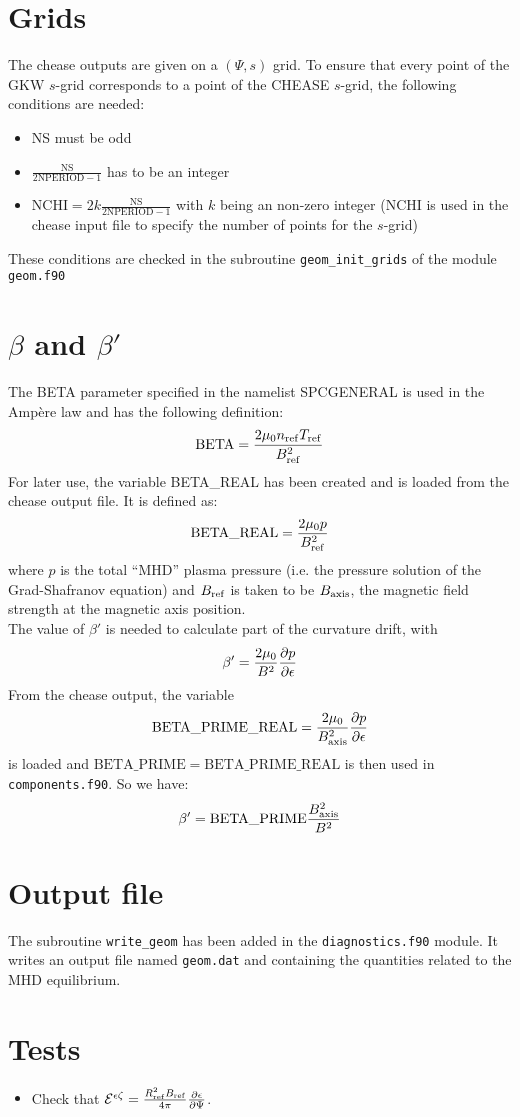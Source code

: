 \documentclass[a4paper,12pt]{article}
\newcommand{\ind}[1]{\ensuremath{_{\rm{#1}}}}
\begin{document}
\section{Grids}
The chease outputs are given on a $(\Psi,s)$ grid. To ensure that every point of the GKW $s$-grid corresponds to a point of the CHEASE $s$-grid, the following conditions are needed:
\begin{itemize}
 \item NS must be odd
 \item $\frac{\mathrm{NS}}{2\mathrm{NPERIOD}-1}$ has to be an integer
 \item $\mathrm{NCHI}=2k\frac{\mathrm{NS}}{2\mathrm{NPERIOD}-1}$ with $k$ being an non-zero integer (NCHI is used in the chease input file to specify the number of points for the $s$-grid)
\end{itemize}
These conditions are checked in the subroutine \texttt{geom\_init\_grids} of the module \texttt{geom.f90}

\section{$\beta$ and $\beta'$}
The BETA parameter specified in the namelist SPCGENERAL is used in the Amp\`ere law and has the following definition:
$$\mathrm{BETA}=\frac{2\mu\ind{0}n\ind{ref}T\ind{ref}}{B\ind{ref}^2}$$
For later use, the variable BETA\_REAL has been created and is loaded from the chease output file. It is defined as:
$$\mathrm{BETA\_REAL}=\frac{2\mu\ind{0}p}{B\ind{ref}^2}$$
where $p$ is the total ``MHD'' plasma pressure (i.e. the pressure solution of the Grad-Shafranov equation) and $B\ind{ref}$ is taken to be $B\ind{axis}$, the magnetic field strength at the magnetic axis position. \\
The value of $\beta'$ is needed to calculate part of the curvature drift, with
$$\beta'=\frac{2\mu\ind{0}}{B^2}\frac{\partial p}{\partial \epsilon}$$
From the chease output, the variable 
$$\mathrm{BETA\_PRIME\_REAL}=\frac{2\mu\ind{0}}{B\ind{axis}^2}\frac{\partial p}{\partial \epsilon}$$
is loaded and $\mathrm{BETA\_PRIME}=\mathrm{BETA\_PRIME\_REAL}$ is then used in \texttt{components.f90}. So we have:
$$\beta'=\mathrm{BETA\_PRIME}\frac{B\ind{axis}^2}{B^2}$$

\section{Output file}
The subroutine \texttt{write\_geom} has been added in the \texttt{diagnostics.f90} module. It writes an output file named \texttt{geom.dat} and containing the quantities related to the MHD equilibrium.

\section{Tests}
\begin{itemize}
 \item Check that $\mathcal{E}^{\epsilon\zeta}=\frac{R\ind{ref}^2B\ind{ref}}{4\pi}\frac{\partial\epsilon}{\partial \Psi}$.
\end{itemize}




\end{document}
